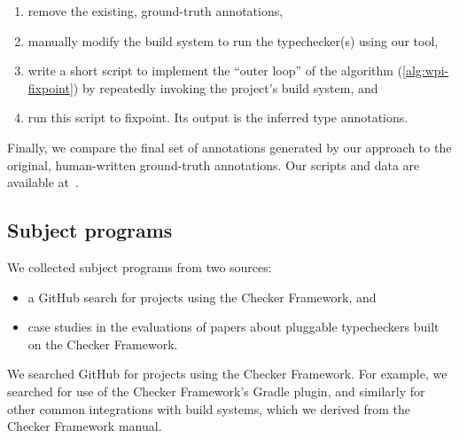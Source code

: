 \begin{enumerate}
\item remove the existing, ground-truth annotations,
\item manually modify the build system to run the typechecker(s) using our
  tool,%
\item write a short script to implement the ``outer loop'' of the algorithm
  (\ie \cref{alg:wpi-fixpoint}) by repeatedly invoking the project's build
  system, %
    and
\item run this script to fixpoint.  Its output is the inferred type annotations.
\end{enumerate}

Finally, we compare the final set of annotations generated by our approach to the original,
human-written ground-truth annotations. Our scripts and data are available
at~.


\subsection{Subject programs}
\label{sec:subject-programs}

We collected subject programs from two sources:
\begin{itemize}
\item a GitHub search for projects using the Checker Framework, and
\item case studies in the evaluations of papers about pluggable typecheckers built
  on the Checker Framework.
\end{itemize}

We searched GitHub for projects using the Checker Framework.  For example,
we searched for use of the Checker Framework's Gradle plugin, and similarly
for other common integrations with build systems, which we derived from
the Checker Framework manual.

